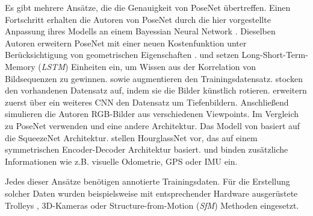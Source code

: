 Es gibt mehrere Ansätze, die die Genauigkeit von PoseNet übertreffen.
Einen Fortschritt erhalten die Autoren von PoseNet durch die hier \cite{kendallModellingUncertaintyDeep2015a} vorgestellte Anpassung ihres Modells an einem Bayessian Neural Network \cite{denkerTransformingNeuralNetOutput1991, mackayPracticalBayesianFramework1991}.
Dieselben Autoren erweitern PoseNet mit einer neuen Kostenfunktion unter Berücksichtigung von geometrischen Eigenschaften \cite{kendallGeometricLossFunctions2017}. \citet{walchImagebasedLocalizationUsing2016} und \citet{clarkVidLocDeepSpatioTemporal2017} setzen Long-Short-Term-Memory (\textit{LSTM}) \cite{hochreiterLongShortTermMemory1997a} Einheiten ein, um Wissen aus der Korrelation von Bildsequenzen zu gewinnen. \citet{wuDelvingDeeperConvolutional2017} sowie \citet{naseerDeepRegressionMonocular2017} augmentieren den Trainingsdatensatz. \citet{wuDelvingDeeperConvolutional2017} stocken den vorhandenen Datensatz auf, indem sie die Bilder künstlich rotieren. \citet{naseerDeepRegressionMonocular2017} erweitern zuerst über ein weiteres CNN den Datensatz um Tiefenbildern. Anschließend simulieren die Autoren RGB-Bilder aus verschiedenen Viewpoints. Im Vergleich zu PoseNet verwenden \citet{mullerSQUEEZEPOSENETIMAGEBASED2017} und \citet{melekhovImageBasedLocalizationUsing2017} eine andere Architektur. 
Das Modell von \citet{mullerSQUEEZEPOSENETIMAGEBASED2017} basiert auf die SqueezeNet \cite{iandolaSqueezeNetAlexNetlevelAccuracy2016} Architektur. \citet{melekhovImageBasedLocalizationUsing2017} stellen HourglassNet vor, das auf einem symmetrischen Encoder-Decoder Architektur basiert. \citet{brahmbhattGeometryAwareLearningMaps2018} und \citet{valadaDeepAuxiliaryLearning2018, valadaIncorporatingSemanticGeometric} binden zusätzliche Informationen wie z.B. visuelle Odometrie, GPS oder IMU ein. 

Jedes dieser Ansätze benötigen annotierte Trainingsdaten. Für die Erstellung solcher Daten wurden beispielsweise mit entsprechender Hardware ausgerüstete Trolleys \cite{huitlTUMindoorExtensiveImage2012}, 3D-Kameras \cite{izadiKinectFusionRealtime3D2011} oder Structure-from-Motion (\textit{SfM}) Methoden \cite{kendallPoseNetConvolutionalNetwork2015} eingesetzt.

